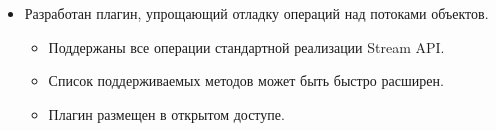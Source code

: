 \begin{frame}
\frametitle{\insertsection} 
\framesubtitle{\insertsubsection}
\begin{itemize}
	\item Разработан плагин, упрощающий отладку операций над потоками объектов.
	\begin{itemize}
		\item Поддержаны все операции стандартной реализации Stream API.
		\item Список поддерживаемых методов может быть быстро расширен.
		\item Плагин размещен в открытом доступе.
	\end{itemize}
	
\end{itemize}
\end{frame}
 
